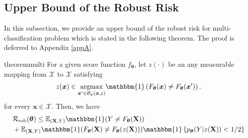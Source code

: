 \documentclass[nohyperref]{article}
\theoremstyle{plain}
\theoremstyle{definition}
\theoremstyle{remark}
\begin{document}

\subsection{Upper Bound of the Robust Risk}
\label{upperbound:arow}

In this subsection, we provide an upper bound of the robust risk for multi-classification problem which is stated in the following theorem. The proof is deferred to Appendix \ref{appA}.

\begin{restatable}{theorem}{multi}
\label{theorem1}
    For a given score function $f_{\bm{\theta}}$, let $z(\cdot)$ be an any measurable mapping from $\mathcal{X}$ to $\mathcal{X}$ satisfying
\begin{equation*}
    z(\bm{x}) \in \underset{\bm{x}' \in \mathcal{B}_{p}(\bm{x}, \varepsilon)}{\operatorname{argmax}} \mathbbm{1} \left( F_{\bm{\theta}}(\bm{x}) \neq F_{\bm{\theta}}(\bm{x}')\right).
\end{equation*}
for every $\bm{x} \in \mathcal{X}$. Then, we have
\begin{align} 
    & \mathcal{R}_{\text{rob}}(\bm{\theta}) \leq \mathbb{E}_{(\mathbf{X},Y)} \mathbbm{1}(Y \neq F_{\bm{\theta}}(\mathbf{X})) \nonumber \\
    & + \mathbb{E}_{(\mathbf{X}, Y)}{\mathbbm{1}(F_{\bm{\theta}}(\mathbf{X}) \neq F_{\bm{\theta}}(z(\mathbf{X})))} \mathbbm{1} \left\{ p_{\bm{\theta}}(Y | z(\mathbf{X})) < 1/2 \right\}
    \label{arow:ub}
\end{align}
\end{restatable}
\end{document}
